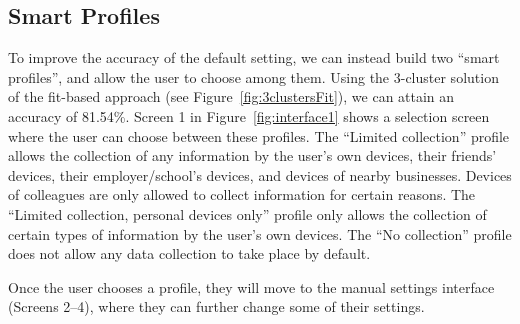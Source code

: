 \subsection{Smart Profiles}
To improve the accuracy of the default setting, we can instead build two ``smart profiles'', and allow the user to choose among them. Using the 3-cluster solution of the fit-based approach (see Figure~\ref{fig:3clustersFit}), we can attain an accuracy of 81.54\%. Screen 1 in Figure~\ref{fig:interface1} shows a selection screen where the user can choose between these profiles. The ``Limited collection'' profile allows the collection of any information by the user's own devices, their friends' devices, their employer/school's devices, and devices of nearby businesses. Devices of colleagues are only allowed to collect information for certain reasons. The ``Limited collection, personal devices only'' profile only allows the collection of certain types of information by the user's own devices. The ``No collection'' profile does not allow any data collection to take place by default.

Once the user chooses a profile, they will move to the manual settings interface (Screens 2--4), where they can further change some of their settings.

